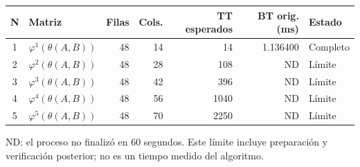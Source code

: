 \begin{tabular}{c l r r r r l}
\toprule
N & Matriz & Filas & Cols. & TT esperados & BT orig. (ms) & Estado \\
\midrule
1 & $\varphi^{1}(\theta(A,B))$ & 48 & 14 & 14 & 1.136400 & Completo \\
2 & $\varphi^{2}(\theta(A,B))$ & 48 & 28 & 108 & ND & Límite \\
3 & $\varphi^{3}(\theta(A,B))$ & 48 & 42 & 396 & ND & Límite \\
4 & $\varphi^{4}(\theta(A,B))$ & 48 & 56 & 1040 & ND & Límite \\
5 & $\varphi^{5}(\theta(A,B))$ & 48 & 70 & 2250 & ND & Límite \\
\bottomrule
\end{tabular}
{\footnotesize ND: el proceso no finalizó en 60 segundos. Este límite incluye preparación y verificación posterior; no es un tiempo medido del algoritmo.\par}
